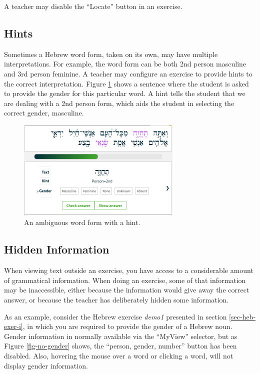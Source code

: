 \documentclass[11pt,oneside,a4paper]{memoir}
\newcommand{\heb}[1]{{\RL {\ezr #1}}}
\begin{document}
A teacher may disable the ``Locate'' button in an exercise.


\subsection{Hints}

Sometimes a Hebrew word form, taken on its own, may have multiple interpretations. For example, the
word form \heb{תֶחֱזֶה} can be both 2nd person masculine and 3rd person feminine. A teacher may
configure an exercise to provide hints to the correct interpretation. Figure \ref{fig-ambig} shows
a sentence where the student is asked to provide the gender for this particular word. A hint tells
the student that we are dealing with a 2nd person form, which aids the student in selecting the
correct gender, masculine.

\begin{figure}
  \begin{center}
    \includegraphics[width=0.7\textwidth]{fig-ambig.png}
  \end{center}
  \caption{An ambiguous word form with a hint.}\label{fig-ambig}
\end{figure}


\subsection{Hidden Information}

When viewing text outside an exercise, you have access to a considerable amount of grammatical
information. When doing an exercise, some of that information may be inaccessible, either because
the information would give away the correct answer, or because the teacher has deliberately hidden
some information.

As an example, consider the Hebrew exercise \emph{demo1} presented in section \ref{sec-heb-exer-i}, in
which you are required to provide the gender of a Hebrew noun. Gender information in normally
available via the ``MyView'' selector, but as Figure \ref{fig-no-gender} shows, the ``person,
gender, number'' button has been disabled. Also, hovering the mouse over a word or clicking a word, will
not display gender information.
\end{document}
